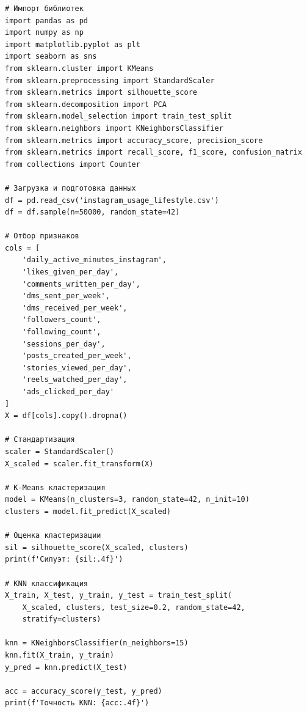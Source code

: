 \documentclass[14pt, a4paper]{extarticle}
\begin{document}
\small
\begin{verbatim}
# Импорт библиотек
import pandas as pd
import numpy as np
import matplotlib.pyplot as plt
import seaborn as sns
from sklearn.cluster import KMeans
from sklearn.preprocessing import StandardScaler
from sklearn.metrics import silhouette_score
from sklearn.decomposition import PCA
from sklearn.model_selection import train_test_split
from sklearn.neighbors import KNeighborsClassifier
from sklearn.metrics import accuracy_score, precision_score
from sklearn.metrics import recall_score, f1_score, confusion_matrix
from collections import Counter

# Загрузка и подготовка данных
df = pd.read_csv('instagram_usage_lifestyle.csv')
df = df.sample(n=50000, random_state=42)

# Отбор признаков
cols = [
    'daily_active_minutes_instagram',
    'likes_given_per_day',
    'comments_written_per_day',
    'dms_sent_per_week',
    'dms_received_per_week',
    'followers_count',
    'following_count',
    'sessions_per_day',
    'posts_created_per_week',
    'stories_viewed_per_day',
    'reels_watched_per_day',
    'ads_clicked_per_day'
]
X = df[cols].copy().dropna()

# Стандартизация
scaler = StandardScaler()
X_scaled = scaler.fit_transform(X)

# K-Means кластеризация
model = KMeans(n_clusters=3, random_state=42, n_init=10)
clusters = model.fit_predict(X_scaled)

# Оценка кластеризации
sil = silhouette_score(X_scaled, clusters)
print(f'Силуэт: {sil:.4f}')

# KNN классификация
X_train, X_test, y_train, y_test = train_test_split(
    X_scaled, clusters, test_size=0.2, random_state=42,
    stratify=clusters)

knn = KNeighborsClassifier(n_neighbors=15)
knn.fit(X_train, y_train)
y_pred = knn.predict(X_test)

acc = accuracy_score(y_test, y_pred)
print(f'Точность KNN: {acc:.4f}')
\end{verbatim}
\normalsize
\end{document}
